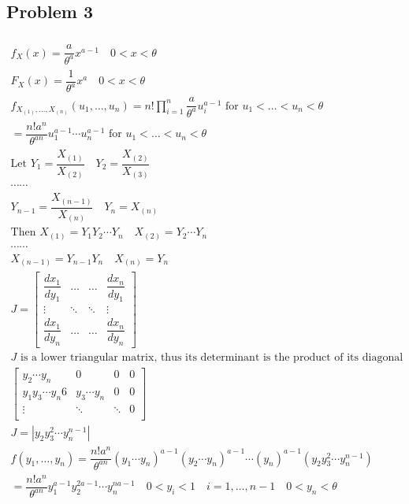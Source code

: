\documentclass{article}
\begin{document}
\begin{flushleft}
	\section*{Problem 3}
	
\begin{multline*}\\
f_X(x)=\dfrac{a}{\theta^a}x^{a-1} \quad 0<x<\theta\\
F_X(x)=\dfrac{1}{\theta^a}x^a \quad 0<x<\theta\\
f_{X_{(1)},\dots,X_{(n)}}(u_1,\dots,u_n)=n!\prod_{i=1}^{n}\dfrac{a}{\theta^a}u_i^{a-1} \text{ for } u_1<\dots<u_n<\theta\\
=\dfrac{n!a^n}{\theta^{an}}u_1^{a-1}\cdots u_n^{a-1} \text{ for } u_1<\dots<u_n<\theta\\
\text{Let } Y_1=\dfrac{X_{(1)}}{X_{(2)}} \quad Y_2=\dfrac{X_{(2)}}{X_{(3)}}\\ \cdots \cdots\\
Y_{n-1}=\dfrac{X_{(n-1)}}{X_{(n)}} \quad Y_n=X_{(n)}\\
\text{Then } X_{(1)}=Y_1 Y_2\cdots Y_n \quad X_{(2)}=Y_2 \cdots Y_n\\
\cdots \cdots\\
X_{(n-1)}=Y_{n-1}Y_n \quad X_{(n)}=Y_{n}\\
J=\begin{bmatrix} 
\dfrac{d x_1}{d y_1} & \dots & \dots& \dfrac{d x_n}{d y_1}\\
\vdots & \ddots & \ddots &\vdots  \\
\dfrac{d x_1}{d y_n} &  \dots & \dots & \dfrac{d x_n}{d y_n} 
\end{bmatrix}\\
J \text{ is a lower triangular matrix, thus its determinant is the product of its diagonal values}\\
\begin{bmatrix}
y_2\cdots y_n & 0 & 0&0 \\
y_1y_3\cdots y_n6 & y_3\cdots y_n &0 &0\\
\vdots & \ddots & \ddots & 0 \\
 & & & 
\end{bmatrix}\\
J=|y_2y_3^2\cdots y_n^{n-1}|\\
f(y_1,\dots,y_n)=\dfrac{n!a^n}{\theta^{an}}(y_1\cdots y_n)^{a-1}(y_2\cdots y_n)^{a-1}\cdots (y_n)^{a-1}(y_2y_3^2\cdots y_n^{n-1})\\
=\dfrac{n!a^n}{\theta^{an}}y_1^{a-1}y_2^{2a-1}\cdots y_n^{na-1} \quad 0<y_i<1 \quad i=1,\dots,n-1 \quad 0<y_n<\theta\\

\end{multline*}
\end{flushleft}
\end{document}

